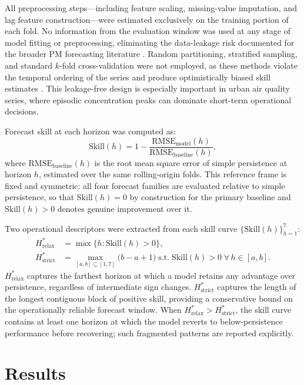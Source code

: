 \documentclass[12pt, a4paper]{article}
\newcommand{\Hrelax}{H^{*}_{\mathrm{relax}}}
\newcommand{\Hstrict}{H^{*}_{\mathrm{strict}}}
\newcommand{\Skill}{\mathrm{Skill}}
\newcommand{\rmseM}{\mathrm{RMSE}_{\mathrm{model}}}
\newcommand{\rmseB}{\mathrm{RMSE}_{\mathrm{baseline}}}
\newcommand{\skillformula}{\Skill(h) = 1 - \dfrac{\rmseM(h)}{\rmseB(h)}}
\begin{document}
All preprocessing steps---including feature scaling,
missing-value imputation, and lag feature construction---were
estimated exclusively on the training portion of each fold.
No information from the evaluation window was used at any
stage of model fitting or preprocessing, eliminating the
data-leakage risk documented for the broader PM forecasting
literature \citep{GarciaCrespi2026}.
Random partitioning, stratified sampling, and standard
$k$-fold cross-validation were not employed, as these methods
violate the temporal ordering of the series and produce
optimistically biased skill estimates \citep{Cerqueira2020}.
This leakage-free design is especially important in urban air
quality series, where episodic concentration peaks can dominate
short-term operational decisions.

Forecast skill at each horizon was computed as:
\begin{equation}
  \skillformula,
  \label{eq:skill}
\end{equation}
where $\rmseB(h)$ is the root mean square error of simple
persistence at horizon $h$, estimated over the same
rolling-origin folds.
This reference frame is fixed and symmetric: all four forecast
families are evaluated relative to simple persistence, so that
$\Skill(h) = 0$ by construction for the primary baseline and
$\Skill(h) > 0$ denotes genuine improvement over it.

Two operational descriptors were extracted from each skill
curve $\{\Skill(h)\}_{h=1}^{7}$:
\begin{align}
  \Hrelax  &= \max\bigl\{h : \Skill(h) > 0\bigr\},
             \label{eq:hrelax} \\
  \Hstrict &= \max_{[a,b]\subseteq[1,7]}
             \bigl(b - a + 1\bigr)
             \;\text{s.t.}\;
             \Skill(h) > 0 \;\forall\, h \in [a,b].
             \label{eq:hstrict}
\end{align}
$\Hrelax$ captures the farthest horizon at which a model
retains any advantage over persistence, regardless of
intermediate sign changes.
$\Hstrict$ captures the length of the longest contiguous
block of positive skill, providing a conservative bound on
the operationally reliable forecast window.
When $\Hrelax > \Hstrict$, the skill curve contains at
least one horizon at which the model reverts to
below-persistence performance before recovering; such
fragmented patterns are reported explicitly.

\section{Results}
\label{sec:results}
\end{document}
